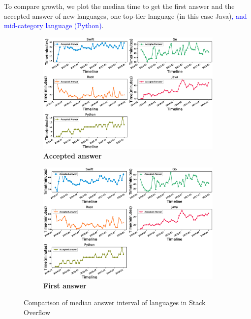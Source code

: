 To compare growth, we plot the median time to get the first answer and the accepted answer of new languages, one top-tier language (in this case Java)\textcolor{blue}{, and mid-category language (Python)}.
\begin{figure}[htbp]
\begin{subfigure}{0.6\textwidth}
\centering
\hspace{-3cm}
\includegraphics[scale=0.38]{figures/AcceptedAnswerInterval.eps}
\caption{\textbf{Accepted answer}}
\label{fig:Accepted Answer interval}
\end{subfigure}
\begin{subfigure}{0.6\textwidth}
\centering
\hspace{-3cm}
\includegraphics[scale=0.38]{figures/FirstAnswerInterval.eps}
\caption{\textbf{First answer}}
\label{fig:First Answer interval}
\end{subfigure}
\caption{Comparison of median answer interval  of languages in Stack Overflow}
\label{fig:Answer intervals}
\end{figure}
